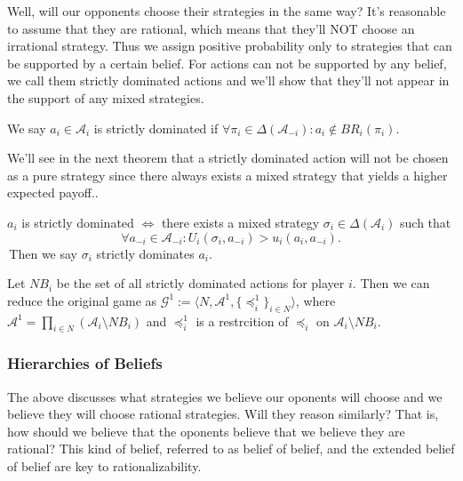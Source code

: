 Well, will our opponents choose their strategies in the same way? It's reasonable to assume that they are rational, which means that they'll NOT choose an irrational strategy. Thus we assign positive probability only to strategies that can be supported by a certain belief. For actions can not be supported by any belief, we call them strictly dominated actions and we'll show that they'll not appear in the support of any mixed strategies.
\begin{definition}
    We say $a_i\in \mathcal{A}_i$ is strictly dominated if $\forall \pi_i\in \Delta(\mathcal{A}_{-i}): a_i\notin BR_i(\pi_i)$.
\end{definition}

We'll see in the next theorem that a strictly dominated action will not be chosen as a pure strategy since there always exists a mixed strategy that yields a higher expected payoff..

\begin{theorem}[Pearce] \label{thm: pearce}
    $a_i$ is strictly dominated $\iff$ there exists a mixed strategy $\sigma_i \in \Delta(\mathcal{A}_i)$ such that $$\forall a_{-i} \in \mathcal{A}_{-i}:U_i(\sigma_i, a_{-i})> u_i(a_i,a_{-i}).$$
    \,Then we say $\sigma_i$ strictly dominates $a_i$.
\end{theorem}

Let $NB_i$ be the set of all strictly dominated actions for player $i$. Then we can reduce the original game as $\mathcal{G}^1:=\langle N, \mathcal{A}^1, \{\preceq_i^1\}_{i\in N}\rangle $, where $\mathcal{A}^1=\prod_{i\in N} (\mathcal{A}_i\setminus NB_i)$ and $\preceq_i^1$ is a restrcition of $\preceq_i$ on $\mathcal{A}_i\setminus NB_i$.

\subsubsection{Hierarchies of Beliefs}
The above discusses what strategies we believe our oponents will choose and we believe they will choose rational strategies. Will they reason similarly? That is, how should we believe that the oponents believe that we believe they are rational?
This kind of belief, referred to as belief of belief, and the extended belief of belief are key to rationalizability.

